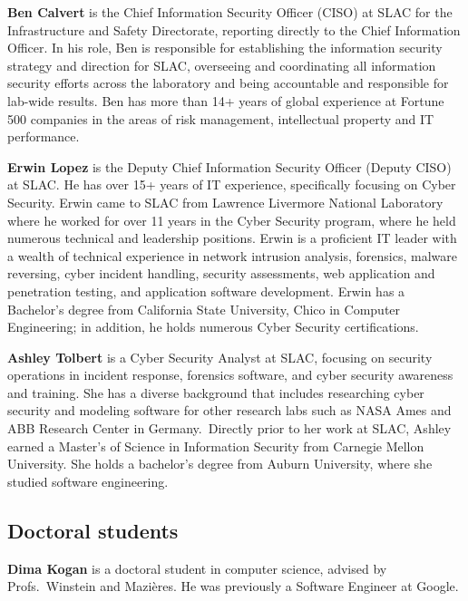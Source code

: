 \documentclass[10pt]{article}
\newcommand{\slim}{\vspace{0.5\baselineskip}}
\begin{document}
\noindent \textbf{Ben Calvert} is the Chief Information Security
Officer (CISO) at SLAC for the Infrastructure and Safety Directorate,
reporting directly to the Chief Information Officer. In his role, Ben
is responsible for establishing the information security strategy and
direction for SLAC, overseeing and coordinating all information
security efforts across the laboratory and being accountable and
responsible for lab-wide results. Ben has more than 14+ years of
global experience at Fortune 500 companies in the areas of risk
management, intellectual property and IT performance.

\slim

\noindent \textbf{Erwin Lopez} is the Deputy Chief Information
Security Officer (Deputy CISO) at SLAC. He has over 15+ years of IT
experience, specifically focusing on Cyber Security. Erwin came to
SLAC from Lawrence Livermore National Laboratory where he worked for
over 11 years in the Cyber Security program, where he held numerous
technical and leadership positions. Erwin is a proficient IT leader
with a wealth of technical experience in network intrusion analysis,
forensics, malware reversing, cyber incident handling, security
assessments, web application and penetration testing, and application
software development. Erwin has a Bachelor's degree from California
State University, Chico in Computer Engineering; in addition, he holds
numerous Cyber Security certifications.

\slim

\noindent \textbf{Ashley Tolbert} is a Cyber Security Analyst at SLAC,
focusing on security operations in incident response, forensics
software, and cyber security awareness and training. She has a diverse
background that includes researching cyber security and modeling
software for other research labs such as NASA Ames and ABB Research
Center in Germany. Directly prior to her work at SLAC, Ashley earned a
Master's of Science in Information Security from Carnegie Mellon
University. She holds a bachelor’s degree from Auburn University,
where she studied software engineering.  \slim

\subsection{Doctoral students}

\noindent \textbf{Dima Kogan} is a doctoral student in computer science,
advised by Profs.~Winstein and Mazi\`{e}res. He was previously a Software
Engineer at Google.
\end{document}
